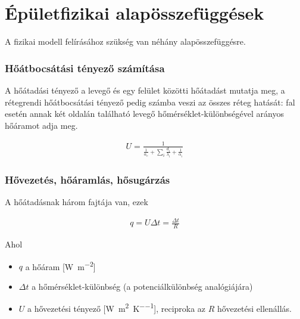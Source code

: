  



\section{Épületfizikai alapösszefüggések}
 
 A fizikai modell felírásához szükség van néhány alapösszefüggésre.
 
 \subsubsection*{Hőátbocsátási tényező számítása}
 A hőátadási tényező a levegő és egy felület közötti hőátadást mutatja meg,
 a rétegrendi hőátbocsátási tényező pedig számba veszi az összes réteg hatását: fal esetén annak két oldalán található levegő hőmérséklet-különbségével arányos hőáramot adja meg. 
 
 \begin{equation}\label{eq_hoatbcsatas_U}
 \begin{aligned}
 U = \frac{1}{\frac{1}{\alpha_e}+\sum\limits_{i}^{}\frac{d_i}{\lambda_i}+\frac{1}{\alpha_i}}
 \end{aligned}
 \end{equation}
 
\subsubsection*{Hővezetés, hőáramlás, hősugárzás}

A hőátadásnak három fajtája van, ezek 

\begin{equation} \label{eq_hoaram_alap}
\begin{aligned}
q = U\Delta t = \frac{\Delta t}{R}
\end{aligned}
\end{equation}

Ahol 

\begin{itemize}[itemsep=6pt,topsep=0pt,parsep=0pt,partopsep=0pt]
	\item[] $q$ a hőáram [\si[per-mode=fraction]{\watt\per\metre\squared}]
	\item[] $\Delta t$ a hőmérséklet-különbség (a potenciálkülönbség analógiájára)
	\item[] $U$ a hővezetési tényező [\si[per-mode=fraction]{\watt\per\metre\squared\per\kelvin}], reciproka az $R$ hővezetési ellenállás.
\end{itemize}


